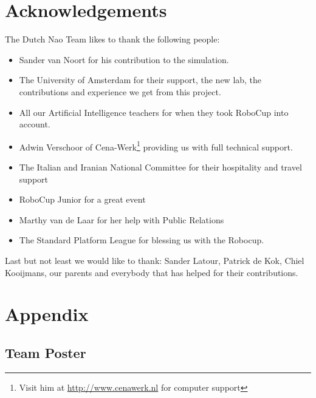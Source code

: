 \documentclass[a4paper]{article}
\begin{document}
\section{Acknowledgements}
The Dutch Nao Team likes to thank the following people:
\begin{itemize}
\item Sander van Noort for his contribution to the simulation. 
\item The University of Amsterdam for their support, the new lab, the contributions and experience we get from this project. 
\item All our Artificial Intelligence teachers for when they took RoboCup into account.
\item Adwin Verschoor of Cena-Werk\footnote{Visit him at \url{http://www.cenawerk.nl} for computer support} providing us with full technical support. 
\item The Italian and Iranian National Committee for their hospitality and travel support
\item RoboCup Junior for a great event
\item Marthy van de Laar for her help with Public Relations
\item The Standard Platform League for blessing us with the Robocup.
\end{itemize}
Last but not least we would like to thank: Sander Latour, Patrick de Kok, Chiel Kooijmans, our parents and everybody that has helped for their contributions.
\newpage



\section{Appendix}
\subsection{Team Poster}
\end{document}
